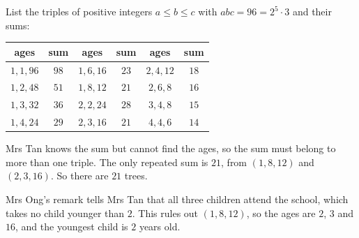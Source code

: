 List the triples of positive integers $a\le b\le c$ with $abc=96=2^5\cdot3$ and their sums:
\begin{center}
\begin{tabular}{c|c||c|c||c|c}
ages & sum & ages & sum & ages & sum\\
\hline
$1,1,96$ & $98$ & $1,6,16$ & $23$ & $2,4,12$ & $18$\\
$1,2,48$ & $51$ & $1,8,12$ & $21$ & $2,6,8$ & $16$\\
$1,3,32$ & $36$ & $2,2,24$ & $28$ & $3,4,8$ & $15$\\
$1,4,24$ & $29$ & $2,3,16$ & $21$ & $4,4,6$ & $14$
\end{tabular}
\end{center}
Mrs Tan knows the sum but cannot find the ages, so the sum must belong to more than one triple. The only repeated sum is $21$, from $(1,8,12)$ and $(2,3,16)$. So there are $\boxed{21}$ trees.

Mrs Ong's remark tells Mrs Tan that all three children attend the school, which takes no child younger than $2$. This rules out $(1,8,12)$, so the ages are $2$, $3$ and $16$, and the youngest child is $\boxed{2}$ years old.
